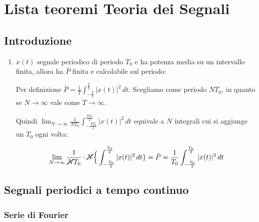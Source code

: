 \documentclass[
]{article}
\author{}
\date{}
\begin{document}
\section{Lista teoremi Teoria dei
Segnali}\label{lista-teoremi-teoria-dei-segnali}

\subsection{Introduzione}\label{introduzione}

\begin{enumerate}
\def\labelenumi{\arabic{enumi}.}
\item
  \(x(t)\) segnale periodico di periodo \(T_0\) e ha potenza media su un
  intervallo finita, allora ha \(\bar{P}\) finita e calcolabile sul
  periodo:

  Per definizione
  \(\bar{P}= \frac{1}{T} \int_{-\frac{T}{2}}^{\frac{T}{2}} |x(t)|^{2} \,dt\).
  Scegliamo come periodo \(NT_0\), in quanto se \(N\to \infty\) vale
  come \(T\to \infty\).

  Quindi
  \(\displaystyle \lim_{N \to \infty} \frac{1}{NT_0} \int_{-\frac{NT_0}{2}}^{\frac{NT_0}{2}} |x(t)|^{2} \,dt\)
  equivale a \(N\) integrali cui si aggiunge un \(T_0\) ogni volta:

  \[
   \displaystyle \lim_{N \to \infty} \frac{1}{\cancel{N}T_0} \cdot \cancel{N} \Big \{ \int_{-\frac{T_0}{2}}^{\frac{T_0}{2}} |x(t)|^{2} \,dt \} = \bar{P} = \frac{1}{T_0} \int_{-\frac{T_0}{2}}^{\frac{T_0}{2}} |x(t)|^{2} \,dt
   \]
\end{enumerate}

\subsection{Segnali periodici a tempo
continuo}\label{segnali-periodici-a-tempo-continuo}

\subsubsection{Serie di Fourier}\label{serie-di-fourier}
\end{document}
